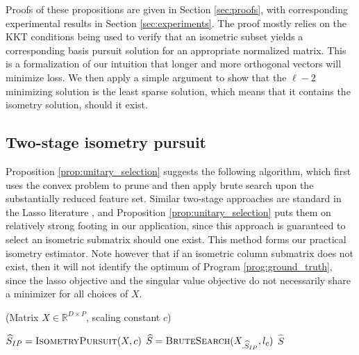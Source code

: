 Proofs of these propositions are given in Section \ref{sec:proofs}, with corresponding experimental results in Section \ref{sec:experiments}.
The proof mostly relies on the KKT conditions \citep{Hastie2015-qa} being used to verify that an isometric subset yields a corresponding basis pursuit solution for an appropriate normalized matrix.
This is a formalization of our intuition that longer and more orthogonal vectors will minimize loss.
We then apply a simple argument to show that the $\ell-2$ minimizing solution is the least sparse solution, which means that it contains the isometry solution, should it exist.

\subsection{Two-stage isometry pursuit}

Proposition \ref{prop:unitary_selection} suggests the following algorithm, which first uses the convex problem to prune and then apply brute search upon the substantially reduced feature set.
Similar two-stage approaches are standard in the Lasso literature \cite{Hesterberg2008-iy, Koelle2022-ju}, and Proposition \ref{prop:unitary_selection} puts them on relatively strong footing in our application, since this approach is guaranteed to select an isometric submatrix should one exist.
This method forms our practical isometry estimator.
Note however that if an isometric column submatrix does not exist, then it will not identify the optimum of Program \ref{prog:ground_truth}, since the lasso objective and the singular value objective do not necessarily share a minimizer for all choices of $X$.

\begin{algorithm}[H]
\caption{\tsip(Matrix ${X} \in \mathbb{R}^{D \times P}$, scaling constant $c$)}
\begin{algorithmic}[1]
\STATE $\widehat{S}_{IP} = \text{{\sc IsometryPursuit}}( X, c)$
\STATE $\widehat{S} = \text {{\sc BruteSearch}}({X}_{.\widehat{S}_{IP}}, l_c)$
 $\widehat{S}$
\end{algorithmic}
\end{algorithm}

